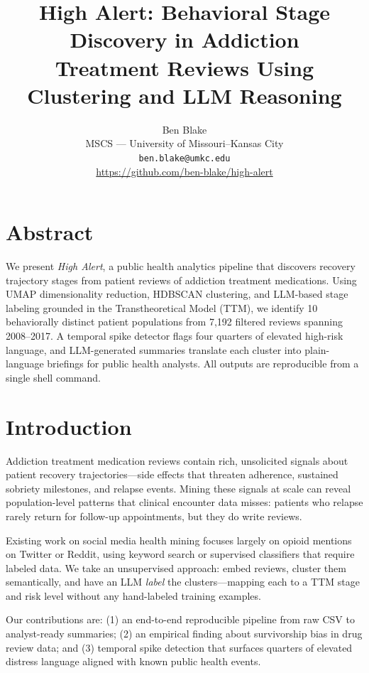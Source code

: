 \documentclass[10pt,twocolumn]{article}
\title{\textbf{High Alert: Behavioral Stage Discovery in Addiction\\
Treatment Reviews Using Clustering and LLM Reasoning}}
\author{Ben Blake\\
MSCS --- University of Missouri--Kansas City\\
\texttt{ben.blake@umkc.edu}\\
\small{\url{https://github.com/ben-blake/high-alert}}}
\date{}
\begin{document}
\maketitle
\thispagestyle{empty}

\section*{Abstract}
We present \textit{High Alert}, a public health analytics pipeline that
discovers recovery trajectory stages from patient reviews of addiction
treatment medications. Using UMAP dimensionality reduction, HDBSCAN
clustering, and LLM-based stage labeling grounded in the Transtheoretical
Model (TTM), we identify 10 behaviorally distinct patient populations from
7,192 filtered reviews spanning 2008--2017. A temporal spike detector
flags four quarters of elevated high-risk language, and LLM-generated
summaries translate each cluster into plain-language briefings for public
health analysts. All outputs are reproducible from a single shell command.

\section{Introduction}
Addiction treatment medication reviews contain rich, unsolicited signals
about patient recovery trajectories---side effects that threaten adherence,
sustained sobriety milestones, and relapse events. Mining these signals at
scale can reveal population-level patterns that clinical encounter data
misses: patients who relapse rarely return for follow-up appointments, but
they do write reviews.

Existing work on social media health mining focuses largely on opioid
mentions on Twitter or Reddit, using keyword search or supervised
classifiers that require labeled data. We take an unsupervised approach:
embed reviews, cluster them semantically, and have an LLM \textit{label}
the clusters---mapping each to a TTM stage and risk level without any
hand-labeled training examples.

Our contributions are: (1) an end-to-end reproducible pipeline from raw
CSV to analyst-ready summaries; (2) an empirical finding about survivorship
bias in drug review data; and (3) temporal spike detection that surfaces
quarters of elevated distress language aligned with known public health
events.
\end{document}
